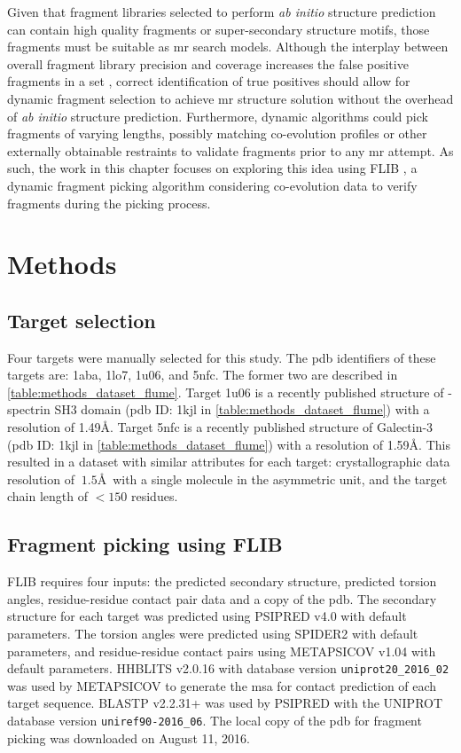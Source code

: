 Given that fragment libraries selected to perform \textit{ab initio} structure prediction can contain high quality fragments or super-secondary structure motifs, those fragments must be suitable as \gls{mr} search models. Although the interplay between overall fragment library precision and coverage increases the false positive fragments in a set \cite{Kalev2011-te}, correct identification of true positives should allow for dynamic fragment selection to achieve \gls{mr} structure solution without the overhead of \textit{ab initio} structure prediction. Furthermore, dynamic algorithms could pick fragments of varying lengths, possibly matching co-evolution profiles or other externally obtainable restraints to validate fragments prior to any \gls{mr} attempt. As such, the work in this chapter focuses on exploring this idea using FLIB \cite{De_Oliveira2015-ba}, a dynamic fragment picking algorithm considering co-evolution data to verify fragments during the picking process.

\section{Methods}
\subsection{Target selection}
Four targets were manually selected for this study. The \gls{pdb} identifiers of these targets are: 1aba, 1lo7, 1u06, and 5nfc. The former two are described in \cref{table:methods_dataset_flume}. Target 1u06 is a recently published structure of \textalpha-spectrin SH3 domain (\gls{pdb} ID: 1kjl in \cref{table:methods_dataset_flume}) with a resolution of 1.49\AA. Target 5nfc is a recently published structure of Galectin-3 (\gls{pdb} ID: 1kjl in \cref{table:methods_dataset_flume}) with a resolution of 1.59\AA. This resulted in a dataset with similar attributes for each target: crystallographic data resolution of $~1.5$\AA\ with a single molecule in the asymmetric unit, and the target chain length of $<150$ residues.

\subsection{Fragment picking using FLIB}
FLIB \cite{De_Oliveira2015-ba} requires four inputs: the predicted secondary structure, predicted torsion angles, residue-residue contact pair data and a copy of the \gls{pdb}. The secondary structure for each target was predicted using PSIPRED v4.0 \cite{Jones1999-fi} with default parameters. The torsion angles were predicted using SPIDER2 \cite{Heffernan2015-wp} with default parameters, and residue-residue contact pairs using METAPSICOV v1.04 \cite{Jones2015-wp} with default parameters. HHBLITS v2.0.16 \cite{Remmert2011-ze} with database version \texttt{uniprot20\_2016\_02} was used by METAPSICOV to generate the \gls{msa} for contact prediction of each target sequence. BLASTP v2.2.31+ \cite{Altschul1990-nc,Camacho2009-ue} was used by PSIPRED with the UNIPROT database version \texttt{uniref90-2016\_06}. The local copy of the \gls{pdb} for fragment picking was downloaded on August 11, 2016.

